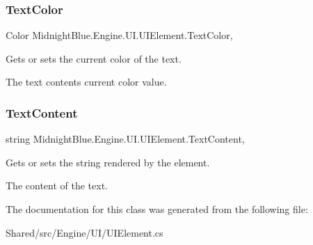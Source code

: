\subsubsection{\texorpdfstring{Text\+Color}{TextColor}}
{\footnotesize\ttfamily Color Midnight\+Blue.\+Engine.\+U\+I.\+U\+I\+Element.\+Text\+Color\hspace{0.3cm}{\ttfamily [get]}, {\ttfamily [set]}}



Gets or sets the current color of the text. 

The text contents current color value.\hypertarget{class_midnight_blue_1_1_engine_1_1_u_i_1_1_u_i_element_a49bc3d1da069a0da5c39218c9538d64f}{}\label{class_midnight_blue_1_1_engine_1_1_u_i_1_1_u_i_element_a49bc3d1da069a0da5c39218c9538d64f} 
\subsubsection{\texorpdfstring{Text\+Content}{TextContent}}
{\footnotesize\ttfamily string Midnight\+Blue.\+Engine.\+U\+I.\+U\+I\+Element.\+Text\+Content\hspace{0.3cm}{\ttfamily [get]}, {\ttfamily [set]}}



Gets or sets the string rendered by the element. 

The content of the text.

The documentation for this class was generated from the following file\+:\begin{DoxyCompactItemize}
\item 
Shared/src/\+Engine/\+U\+I/U\+I\+Element.\+cs\end{DoxyCompactItemize}
